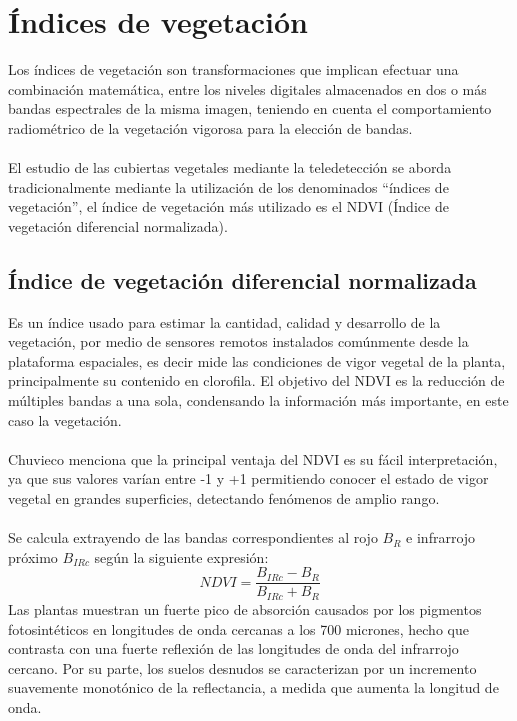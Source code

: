  
\section{\'Indices de vegetaci\'on}
Los \'indices de vegetaci\'on son transformaciones que implican efectuar una combinaci\'on matem\'atica, entre los niveles digitales almacenados en dos o m\'as bandas espectrales de la misma imagen, teniendo en cuenta el comportamiento radiom\'etrico de la vegetaci\'on vigorosa para la elecci\'on de bandas\cite{speranza2005potencialidad}. \\~\\
El estudio de las cubiertas vegetales mediante la teledetecci\'on se aborda tradicionalmente mediante la utilización de los denominados “índices de vegetaci\'on”, el índice de vegetaci\'on m\'as utilizado es el NDVI (\'Indice de vegetaci\'on diferencial normalizada)\cite{sader2000estimacion}.

\subsection{\'Indice de vegetaci\'on diferencial normalizada}
Es un \'indice usado para estimar la cantidad, calidad y desarrollo de la vegetaci\'on, por medio de sensores remotos instalados com\'unmente desde la plataforma espaciales, es decir mide las condiciones de vigor vegetal de la planta, principalmente su contenido en clorofila\cite{salinero2002teledeteccion}. El objetivo del NDVI es la reducci\'on de m\'ultiples bandas a una sola, condensando la informaci\'on m\'as importante, en este caso la vegetaci\'on.\\~\\
Chuvieco\cite{salinero2002teledeteccion} menciona que la principal ventaja del NDVI es su f\'acil interpretaci\'on, ya que sus
valores var\'ian entre -1 y +1 permitiendo conocer el estado de vigor vegetal en grandes superficies, detectando fen\'omenos de amplio rango.\\~\\
Se calcula extrayendo de las bandas correspondientes al rojo $B_{R}$ e infrarrojo pr\'oximo $B_{IRc}$ seg\'un la siguiente expresi\'on:
	\begin{equation}
	\label{e:ndvi}
	NDVI=\dfrac{B_{IRc}-B_{R}}{B_{IRc}+B_{R}}
	\end{equation}
Las plantas muestran un fuerte pico de absorci\'on causados por los pigmentos fotosint\'eticos en longitudes de onda cercanas a los 700 micrones, hecho que contrasta con una fuerte reflexi\'on de las longitudes de onda del infrarrojo cercano. Por su parte, los suelos desnudos se caracterizan por un incremento suavemente monot\'onico de la reflectancia, a medida que aumenta la longitud de onda.


